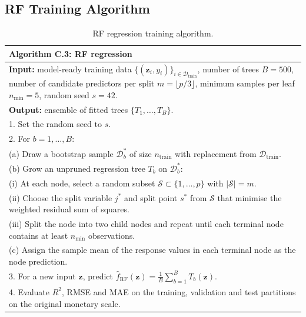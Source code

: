 \subsection{RF Training Algorithm}
\label{annexure:rf_algorithm}

\begin{table}[H]
\centering
{\small
\renewcommand{\arraystretch}{1.15}
\begin{tabular}{p{}}
\toprule
\textbf{Algorithm C.3: RF regression} \\
\midrule
\textbf{Input:} model-ready training data
$\{(\mathbf{z}_i, y_i)\}_{i \in \mathcal{D}_{\mathrm{train}}}$,
number of trees $B = 500$, number of candidate predictors per split
$m = \lfloor p/3 \rfloor$, minimum samples per leaf
$n_{\min} = 5$, random seed $s = 42$. \\[3pt]

\textbf{Output:} ensemble of fitted trees
$\{T_1, \ldots, T_B\}$. \\[3pt]

1. Set the random seed to $s$. \\
2. For $b = 1, \ldots, B$: \\
\quad (a) Draw a bootstrap sample $\mathcal{D}_{b}^{*}$ of size
        $n_{\mathrm{train}}$ with replacement from
        $\mathcal{D}_{\mathrm{train}}$. \\
\quad (b) Grow an unpruned regression tree $T_b$ on
        $\mathcal{D}_{b}^{*}$: \\
\quad\quad (i) At each node, select a random subset
            $\mathcal{S} \subset \{1,\ldots,p\}$ with
            $|\mathcal{S}| = m$. \\
\quad\quad (ii) Choose the split variable $j^{*}$ and split point
            $s^{*}$ from $\mathcal{S}$ that minimise the weighted
            residual sum of squares. \\
\quad\quad (iii) Split the node into two child nodes and repeat
            until each terminal node contains at least $n_{\min}$
            observations. \\
\quad (c) Assign the sample mean of the response values in each
        terminal node as the node prediction. \\
3. For a new input $\mathbf{z}$, predict
   $\hat{f}_{\mathrm{RF}}(\mathbf{z})
   = \frac{1}{B}\sum_{b=1}^{B} T_b(\mathbf{z})$. \\
4. Evaluate \ensuremath{R^2}, RMSE and MAE on the training,
   validation and test partitions on the original monetary scale. \\
\bottomrule
\end{tabular}}
\caption{RF regression training algorithm.}
\label{tab:rf_algorithm_annex}
\end{table}

